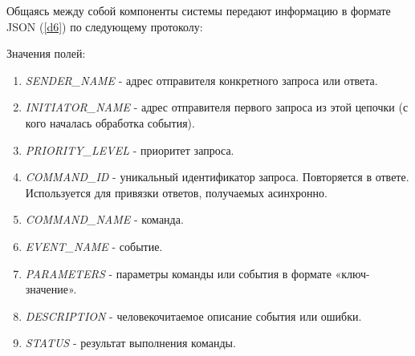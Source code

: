 Общаясь между собой компоненты системы передают информацию в формате JSON (\ref{d6}) по следующему протоколу:


Значения полей:
\begin{enumerate}
    \item \textit{SENDER\_NAME} - адрес отправителя конкретного запроса или ответа.
    \item \textit{INITIATOR\_NAME} - адрес отправителя первого запроса из этой цепочки (с кого началась обработка события).
    \item \textit{PRIORITY\_LEVEL} - приоритет запроса.
    \item \textit{COMMAND\_ID} - уникальный идентификатор запроса. Повторяется в ответе.
    Используется для привязки ответов, получаемых асинхронно.
    \item \textit{COMMAND\_NAME} - команда.
    \item \textit{EVENT\_NAME} - событие.
    \item \textit{PARAMETERS} - параметры команды или события в формате «ключ-значение».
    \item \textit{DESCRIPTION} - человекочитаемое описание события или ошибки.
    \item \textit{STATUS} - результат выполнения команды.
\end{enumerate}
